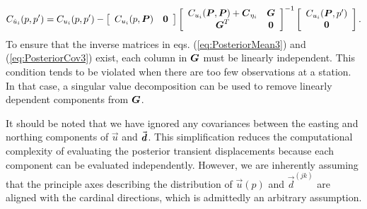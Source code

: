 \documentclass[extra,mreferee]{gji}
\begin{document}
\begin{equation}\label{eq:PosteriorCov3}
C_{\hat{u}_i}(p,p') = C_{u_i}(p,p') - 
                      \left[\begin{array}{cc}
                          C_{u_i}(p,\mitbf{P}) & \mitbf{0} \\
                          \end{array}\right]
                      \left[\begin{array}{cc}
                          C_{u_i}(\mitbf{P},\mitbf{P}) + \mitbf{C}_{\eta_i} & \mitbf{G} \\
                          \mitbf{G}^T  & \mitbf{0} \\
                          \end{array}\right]^{-1}
                      \left[\begin{array}{c}
                          C_{u_i}(\mitbf{P},p') \\
                          \mitbf{0} \\
                          \end{array}\right].
\end{equation}
To ensure that the inverse matrices in eqs. (\ref{eq:PosteriorMean3}) and (\ref{eq:PosteriorCov3}) exist, each column in $\mitbf{G}$ must be linearly independent. This condition tends to be violated when there are too few observations at a station. In that case, a singular value decomposition can be used to remove linearly dependent components from $\mitbf{G}$.   

It should be noted that we have ignored any covariances between the easting and northing components of $\vec{u}$ and $\vec{\mitbf{d}}$. This simplification reduces the computational complexity of evaluating the posterior transient displacements because each component can be evaluated independently. However, we are inherently assuming that the principle axes describing the distribution of $\vec{u}(p)$ and $\vec{d}^{(jk)}$ are aligned with the cardinal directions, which is admittedly an arbitrary assumption. 
\end{document}
